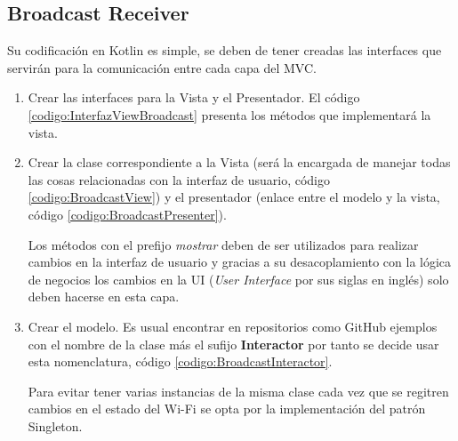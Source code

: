 \subsection{Broadcast Receiver}
\label{codigo:broadcast}
Su codificación en Kotlin es simple, se deben de tener creadas las interfaces que servirán para la comunicación entre cada capa del MVC.
\begin{enumerate}
	\item Crear las interfaces para la Vista y el Presentador. El código \ref{codigo:InterfazViewBroadcast} presenta los métodos que implementará la vista.
	
	
	
	
	
	\item Crear la clase correspondiente a la Vista (será la encargada de manejar todas las cosas relacionadas con la interfaz de usuario, código \ref{codigo:BroadcastView}) y el presentador (enlace entre el modelo y la vista, código \ref{codigo:BroadcastPresenter}).
	
	
	
	Los métodos con el prefijo \textit{mostrar} deben de ser utilizados para realizar cambios en la interfaz de usuario y gracias a su desacoplamiento con la lógica de negocios los cambios en la UI (\textit{User Interface} por sus siglas en inglés) solo deben hacerse en esta capa.
	
	
	
	\item Crear el modelo. Es usual encontrar en repositorios como GitHub ejemplos con el nombre de la clase más el sufijo \textbf{Interactor} por tanto se decide usar esta nomenclatura, código \ref{codigo:BroadcastInteractor}.
	
	
	
	Para evitar tener varias instancias de la misma clase cada vez que se regitren cambios en el estado del Wi-Fi se opta por la implementación del patrón Singleton.
	
\end{enumerate}

